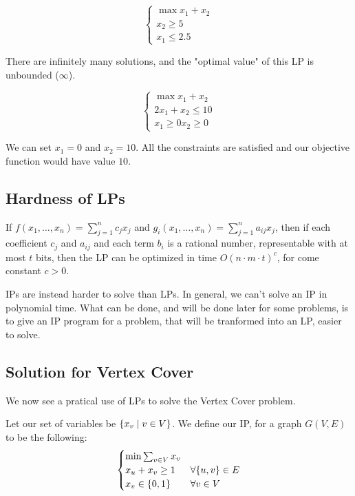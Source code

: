     \begin{equation}
        \begin{cases}
            \max x_1 + x_2\\
            x_2 \geq 5\\
            x_1 \leq 2.5
        \end{cases}
    \end{equation}

    There are infinitely many solutions, and the "optimal value" of this LP is unbounded ($\infty$).

    \begin{equation}
        \begin{cases}
            \max x_1 + x_2\\
            2 x_1 + x_2 \leq 10\\
            x_1 \geq 0
            x_2 \geq 0
        \end{cases}
    \end{equation}

    We can set $x_1 = 0$ and $x_2 = 10$. All the constraints are satisfied and our objective function would have value $10$.


\subsection{Hardness of LPs}
    If $f(x_1, \dots, x_n) = \sum_{j=1}^n c_j x_j$ and $g_i(x_1, \dots, x_n) = \sum_{j=1}^n a_{ij} x_j$, then if each coefficient $c_j$ and $a_{ij}$ and each term $b_i$ is a rational number, representable with at most $t$ bits, then the LP can be optimized in time $O(n \cdot m \cdot t)^c$, for come constant $c > 0$.

    IPs are instead harder to solve than LPs. In general, we can't solve an IP in polynomial time.
    What can be done, and will be done later for some problems, is to give an IP program for a problem, that will be tranformed into an LP, easier to solve.



\subsection{Solution for Vertex Cover}\label{subsec:vc_lp}

    We now see a pratical use of LPs to solve the Vertex Cover problem.

    Let our set of variables be $\{ x_v \; \vert \; v \in V \}$. We define our IP, for a graph $G(V,E)$ to be the following:
    \begin{equation}\label{eq:lp_vc}
        \begin{cases}
            \min \sum_{v \in V} x_v\\
            x_u + x_v \geq 1    & \forall \{ u,v \} \in E\\
            x_v \in \{ 0,1 \}          & \forall v \in V
        \end{cases}
    \end{equation}

